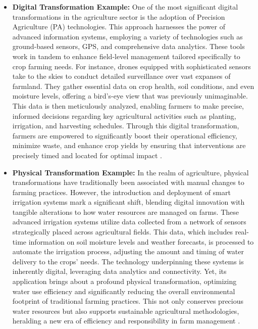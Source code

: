 \documentclass[12pt,a4paper]{article}
\begin{document}
\begin{itemize}
    \item \textbf{Digital Transformation Example:} One of the most significant digital transformations in the agriculture sector is the adoption of Precision Agriculture (PA) technologies. This approach harnesses the power of advanced information systems, employing a variety of technologies such as ground-based sensors, GPS, and comprehensive data analytics. These tools work in tandem to enhance field-level management tailored specifically to crop farming needs. For instance, drones equipped with sophisticated sensors take to the skies to conduct detailed surveillance over vast expanses of farmland. They gather essential data on crop health, soil conditions, and even moisture levels, offering a bird's-eye view that was previously unimaginable. This data is then meticulously analyzed, enabling farmers to make precise, informed decisions regarding key agricultural activities such as planting, irrigation, and harvesting schedules. Through this digital transformation, farmers are empowered to significantly boost their operational efficiency, minimize waste, and enhance crop yields by ensuring that interventions are precisely timed and located for optimal impact \citep{Ref_4}.\\
\end{itemize}

\begin{itemize}
    \item \textbf{Physical Transformation Example:} In the realm of agriculture, physical transformations have traditionally been associated with manual changes to farming practices. However, the introduction and deployment of smart irrigation systems mark a significant shift, blending digital innovation with tangible alterations to how water resources are managed on farms. These advanced irrigation systems utilize data collected from a network of sensors strategically placed across agricultural fields. This data, which includes real-time information on soil moisture levels and weather forecasts, is processed to automate the irrigation process, adjusting the amount and timing of water delivery to the crops' needs. The technology underpinning these systems is inherently digital, leveraging data analytics and connectivity. Yet, its application brings about a profound physical transformation, optimizing water use efficiency and significantly reducing the overall environmental footprint of traditional farming practices. This not only conserves precious water resources but also supports sustainable agricultural methodologies, heralding a new era of efficiency and responsibility in farm management \citep{Ref_4}.
\end{itemize}
\end{document}

